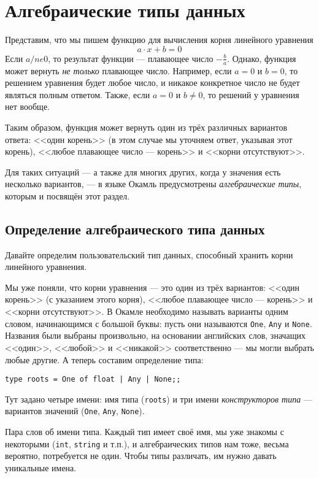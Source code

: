 \section{Алгебраические типы данных}

Представим, что мы пишем функцию для вычисления корня линейного
уравнения $$a \cdot x + b = 0$$ 
Если $a /ne 0$, то результат функции --- плавающее число $-\frac{b}{a}$.
Однако, функция может вернуть \emph{не только} плавающее число. 
Например, если $a = 0$ и $b = 0$, то решением уравнения будет любое число,
и никакое конкретное число не будет являться полным ответом.
Также, если $a = 0$ и $b \ne 0$, то решений у уравнения нет вообще.

Таким образом, функция может вернуть один из трёх различных вариантов
ответа: <<один корень>> (в этом случае мы уточняем ответ, указывая
этот корень), <<любое плавающее число --- корень>> и <<корни отсутствуют>>. 

Для таких ситуаций --- а также для многих других, когда у значения есть
несколько вариантов, --- в языке Окамль предусмотрены 
\emph{алгебраические типы}, которым и посвящён этот раздел.

\subsection{Определение алгебраического типа данных}

Давайте определим пользовательский тип данных, способный хранить 
корни линейного уравнения.

Мы уже поняли, что корни уравнения --- это один из трёх вариантов:
<<один корень>> (с указанием этого корня), <<любое плавающее число --- корень>> и <<корни отсутствуют>>. 
В Окамле необходимо называть варианты одним словом, начинающимся с большой буквы: 
пусть они называются \verb!One!, \verb!Any! и \verb!None!. Названия были выбраны
произвольно, на основании английских слов, значащих <<один>>, <<любой>> и
<<никакой>> соответственно --- мы могли выбрать любые другие. 
А теперь составим определение типа:

\begin{verbatim}
type roots = One of float | Any | None;;
\end{verbatim}

Тут задано четыре имени: имя типа (\verb!roots!) и три имени \emph{конструкторов типа} ---
вариантов значений (\verb!One!, \verb!Any!, \verb!None!). 

Пара слов об имени типа. Каждый тип имеет своё имя, мы уже знакомы с некоторыми 
(\verb!int!, \verb!string! и т.п.), и алгебраических типов нам тоже, весьма вероятно,
потребуется не один. Чтобы типы различать, им нужно давать уникальные имена.

